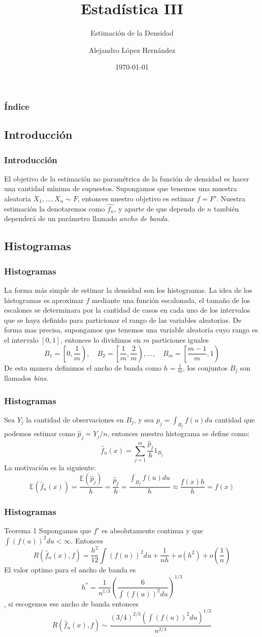 \documentclass[aspectratio=169,spanish]{beamer}
\title{Estadística III}
\subtitle{Estimación de la Densidad}
\author{Alejandro López Hernández}
\institute{FES Acatlán - UNAM}
\date{\today}
\begin{document}
\frame{\titlepage}

\begin{frame}
\frametitle{Índice}
\tableofcontents
\end{frame}

\begin{frame}
\section{Introducción}
\frametitle{Introducción}
El objetivo de la estimación no paramétrica de la función de densidad es hacer una cantidad mínima de supuestos. Supongamos que tenemos una muestra aleatoria $X_1,...,X_n\sim F$, entonces nuestro objetivo es estimar $f=F'$. Nuestra estimación la denotaremos como $\hat{f_n}$, y aparte de que dependa de $n$ también dependerá de un parámetro llamado \textit{ancho de banda}. 
\end{frame}
\begin{frame}
\section{Histogramas}
\frametitle{Histogramas}
La forma más simple de estimar la densidad son los histogramas. La idea de los histogramas es aproximar $f$ mediante una función escalonada, el tamaño de los escalones se determinara por la cantidad de casos en cada uno de los intervalos que se haya definido para particionar el rango de las variables aleatorias. De forma mas precisa, supongamos que tenemos una variable aleatoria cuyo rango es el intervalo $[0,1]$, entonces lo dividimos en $m$ particiones iguales $$B_1=\left[0,\frac{1}{m}\right),\quad B_2=\left[\frac{1}{m},\frac{2}{m}\right),...,\quad B_m=\left[\frac{m-1}{m},1\right)$$
De esta manera definimos el ancho de banda como $h=\frac{1}{m}$, los conjuntos $B_j$ son llamados \textit{bins}.
\end{frame}

\begin{frame}
\frametitle{Histogramas}
Sea $Y_j$ la cantidad de observaciones en $B_j$, y sea $p_j=\int_{B_j}f(u)du$ cantidad que podemos estimar como $\hat{p}_j=Y_j/n$, entonces nuestro histograma se define como:
$$\hat{f}_n(x)=\sum_{j=1}^{m}\frac{\hat{p}_j}{h}1_{B_j}$$
La motivación es la siguiente:
$$\mathbb{E}(\hat{f}_n(x))=\frac{\mathbb{E}(\hat{p}_j)}{h}=\frac{\hat{p}_j}{h}=\frac{\int_{B_j}f(u)du}{h}\approx\frac{f(x)h}{h}=f(x)$$
\end{frame}

\begin{frame}
\frametitle{Histogramas}
\begin{block}{Teorema 1}
Supongamos que $f'$ es absolutamente continua y que $\int (f(u))^2du<\infty$. Entonces $$ R(\hat{f}_n(x),f)=\frac{h^2}{12}\int (f(u))^2du+\frac{1}{nh}+o(h^2)+o\left(\frac{1}{n}\right)$$
El valor optimo para el ancho de banda es $$h^{*}=\frac{1}{n^{1/3}}\left(\frac{6}{\int (f(u))^2du}\right)^{1/3}$$, si escogemos ese ancho de banda entonces $$R(\hat{f}_n(x),f)\sim \frac{(3/4)^{2/3}(\int (f(u))^2du)^{1/3}}{n^{2/3}}$$
\end{block}
\end{frame}
\end{document}
